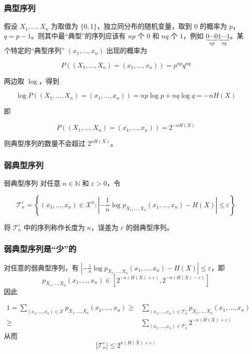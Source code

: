 \documentclass{beamer}
\begin{document}
\begin{frame}
    \frametitle{典型序列}

    假设 $X_1, \dots, X_n$ 为取值为 $\{0, 1\}$，独立同分布的随机变量，取到 $0$ 的概率为 $p$，$q = p - 1$。则其中最``典型''的序列应该有 $np$ 个 $0$ 和 $nq$ 个 $1$，例如 $\underbrace{0\cdots 0}_{np} \underbrace{1\cdots 1}_{nq}$。某个特定的``典型序列'' $(x_1, \dots, x_n)$ 出现的概率为

    \[P((X_1, \dots, X_n) = (x_1, \dots, x_n)) = p^{np} q^{nq}\]

    两边取 $\log$，得到

    \[\log P((X_1, \dots, X_n) = (x_1, \dots, x_n)) = np\log p + nq\log q = -nH(X)\]

    即

    \[P((X_1, \dots, X_n) = (x_1, \dots, x_n)) = 2^{-nH(X)}\]

    则典型序列的数量不会超过 $2^{nH(X)}$。

\end{frame}

\begin{frame}
    \frametitle{弱典型序列}
    
    \begin{block}{弱典型序列}
        对任意 $n\in \mathbb{N}$ 和 $\varepsilon > 0$，令

        \[\mathcal{T}_n^{\varepsilon} = \left\{(x_1, \dots, x_n) \in \mathcal{X}^n: \left\lvert-\frac{1}{n}\log p_{X_1, \dots, X_n}(x_1, \dots, x_n) - H(X)\right\rvert \leq \varepsilon\right\}\]

        将 $\mathcal{T}_n^{\varepsilon}$ 中的序列称作长度为 $n$，误差为 $\varepsilon$ 的弱典型序列。
    \end{block}

\end{frame}

\begin{frame}
    \frametitle{弱典型序列是``少''的}
    
        对任意的弱典型序列，有 $\left\lvert-\frac{1}{n}\log p_{X_1, \dots, X_n}(x_1, \dots, x_n) - H(X)\right\rvert \leq \varepsilon$，即
        \[p_{X_1, \dots, X_n}(x_1, \dots, x_n) \in \left[2^{-n(H(X)+\varepsilon)}, 2^{-n(H(X)-\varepsilon)}\right]\]
        因此

        \[\begin{split}
            1 = \sum_{(x_1, \dots, x_n)\in\mathcal{X}}p_{X_1, \dots, X_n}(x_1, \dots, x_n) \geq & \sum_{(x_1, \dots, x_n)\in\mathcal{T}_n^{\varepsilon}}p_{X_1, \dots, X_n}(x_1, \dots, x_n) \\
            \geq & \sum_{(x_1, \dots, x_n)\in\mathcal{T}_n^{\varepsilon}} 2^{-n(H(X)+\varepsilon)}
        \end{split}\]
        从而
        \[\left\lvert\mathcal{T}_n^{\varepsilon}\right\rvert \leq 2^{n(H(X) + \varepsilon)}\]

\end{frame}
\end{document}
